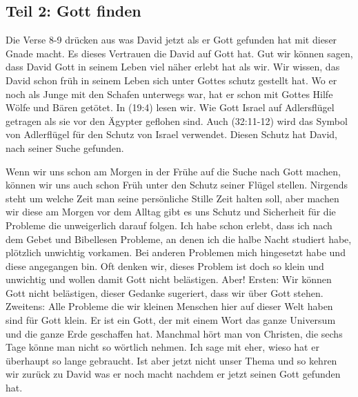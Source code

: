 \documentclass[14pt]{../../inc/mybib}
\begin{document}
    \subsection*{Teil 2: Gott finden}
    \begin{block}
        Die Verse 8-9 drücken aus was David jetzt als er Gott gefunden hat mit dieser Gnade macht. Es dieses Vertrauen die David auf Gott hat. Gut wir können sagen, dass David Gott in seinem Leben viel näher erlebt hat als wir. Wir wissen, das David schon früh in seinem Leben sich unter Gottes schutz gestellt hat. Wo er noch als Junge mit den Schafen unterwegs war, hat er schon mit Gottes Hilfe Wölfe und Bären getötet. In (19:4) lesen wir. Wie Gott Israel auf Adlersflügel getragen als sie vor den Ägypter geflohen sind. Auch (32:11-12) wird das Symbol von Adlerflügel für den Schutz von Israel verwendet. Diesen Schutz hat David, nach seiner Suche gefunden. 
    \end{block}
    \begin{block}
        Wenn wir uns schon am Morgen in der Frühe auf die Suche nach Gott machen, können wir uns auch schon Früh unter den Schutz seiner Flügel stellen. Nirgends steht um welche Zeit man seine persönliche Stille Zeit halten soll, aber machen wir diese am Morgen vor dem Alltag gibt es uns Schutz und Sicherheit für die Probleme die unweigerlich darauf folgen. Ich habe schon erlebt, dass ich nach dem Gebet und Bibellesen Probleme, an denen ich die halbe Nacht studiert habe, plötzlich unwichtig vorkamen. Bei anderen Problemen mich hingesetzt habe und diese angegangen bin. Oft denken wir, dieses Problem ist doch so klein und unwichtig und wollen damit Gott nicht belästigen. Aber! Ersten: Wir können Gott nicht belästigen, dieser Gedanke sugeriert, dass wir über Gott stehen. Zweitens: Alle Probleme die wir kleinen Menschen hier auf dieser Welt haben sind für Gott klein. Er ist ein Gott, der mit einem Wort das ganze Universum und die ganze Erde geschaffen hat. Manchmal hört man von Christen, die sechs Tage könne man nicht so wörtlich nehmen. Ich sage mit eher, wieso hat er überhaupt so lange gebraucht. Ist aber jetzt nicht unser Thema und so kehren wir zurück zu David was er noch macht nachdem er jetzt seinen Gott gefunden hat.
    \end{block}
\end{document}
